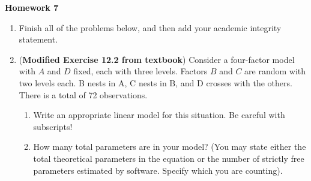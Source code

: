 \documentclass[10pt,twoside]{article}\usepackage[]{graphicx}\usepackage[dvipsnames,svgnames,table]{xcolor}
\begin{document}
\begin{flushright}
\begin{minipage}{.33\textwidth}
\rightline{\today}
\end{minipage}
\end{flushright}

\begin{center}
{\large{\textbf{Homework 7}}}
\end{center}

\begin{enumerate}
  
  \item Finish all of the problems below, and then add your academic integrity statement.
  

  \item (\textbf{Modified Exercise 12.2 from textbook}) Consider a four-factor model with $A$ and $D$ fixed, each with three levels. Factors $B$ and $C$ are random with two levels each. B nests in A, C nests in B, and D crosses with the others. There is a total of 72 observations.
  
  \begin{enumerate}
    \item Write an appropriate linear model for this situation. Be careful with subscripts!
    
  \item How many total parameters are in your model? (You may state either the total theoretical parameters in the equation or the number of strictly free parameters estimated by software. Specify which you are counting).


\end{enumerate}
\end{enumerate}
\end{document}
